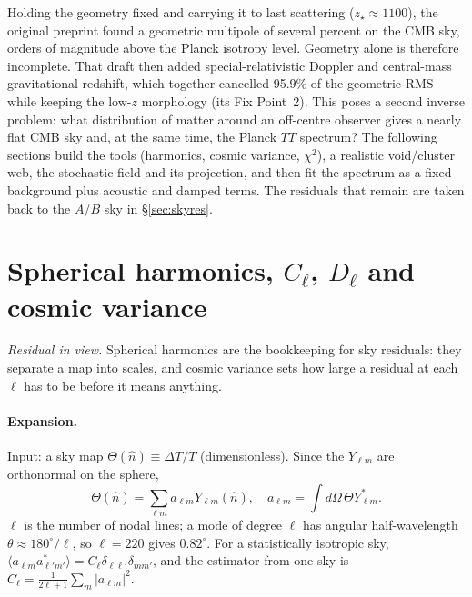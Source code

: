 \documentclass[10pt,twocolumn]{article}
\begin{document}
Holding the geometry fixed and carrying it to last scattering ($z_\star\approx1100$), the original preprint found a geometric multipole of several percent on the CMB sky, orders of magnitude above the Planck isotropy level. Geometry alone is therefore incomplete. That draft then added special-relativistic Doppler and central-mass gravitational redshift, which together cancelled 95.9\% of the geometric RMS while keeping the low-$z$ morphology (its Fix Point~2). This poses a second inverse problem: what distribution of matter around an off-centre observer gives a nearly flat CMB sky and, at the same time, the Planck $TT$ spectrum? The following sections build the tools (harmonics, cosmic variance, $\chi^2$), a realistic void/cluster web, the stochastic field and its projection, and then fit the spectrum as a fixed background plus acoustic and damped terms. The residuals that remain are taken back to the $A$/$B$ sky in \S\ref{sec:skyres}.

\section{Spherical harmonics, $C_\ell$, $D_\ell$ and cosmic variance}\label{sec:harm}
\noindent\emph{Residual in view.} Spherical harmonics are the bookkeeping for sky residuals: they separate a map into scales, and cosmic variance sets how large a residual at each $\ell$ has to be before it means anything.

\paragraph{Expansion.} Input: a sky map $\Theta(\hat n)\equiv\Delta T/T$ (dimensionless). Since the $Y_{\ell m}$ are orthonormal on the sphere,
\begin{equation}
\Theta(\hat n)=\sum_{\ell m}a_{\ell m}Y_{\ell m}(\hat n),\quad a_{\ell m}=\!\int\!d\Omega\,\Theta Y^*_{\ell m}.
\end{equation}
$\ell$ is the number of nodal lines; a mode of degree $\ell$ has angular half-wavelength $\theta\approx180^\circ/\ell$, so $\ell=220$ gives $0.82^\circ$. For a statistically isotropic sky, $\langle a_{\ell m}a^*_{\ell'm'}\rangle=C_\ell\delta_{\ell\ell'}\delta_{mm'}$, and the estimator from one sky is $\hat C_\ell=\frac{1}{2\ell+1}\sum_m|a_{\ell m}|^2$.
\end{document}
